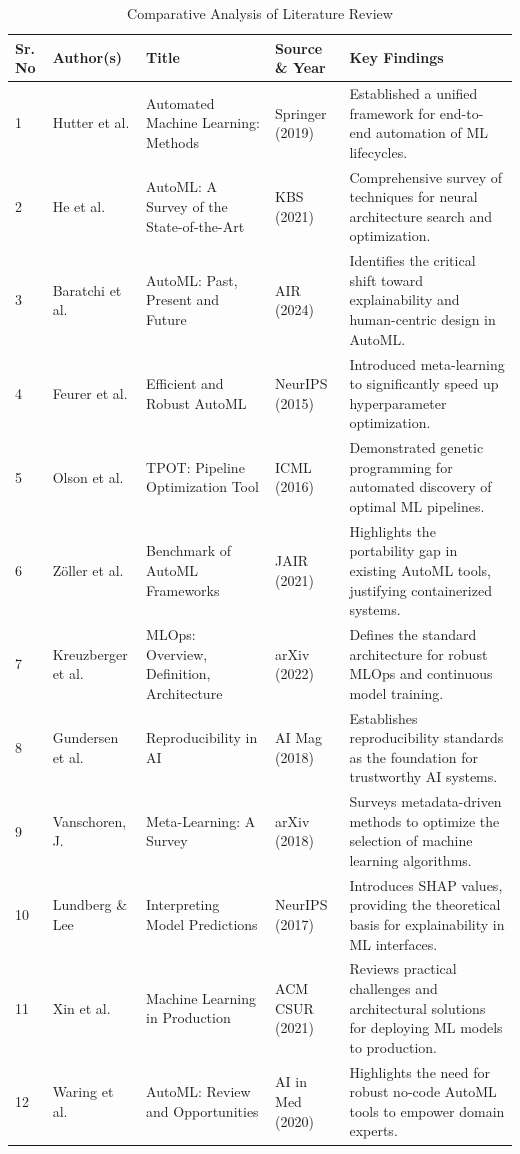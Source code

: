 \begin{table}[H]
    \centering
    \caption{Comparative Analysis of Literature Review}
    \label{tab:lit_review}
    \small
    \begin{tabular}{|p{0.8cm}|p{2.2cm}|p{4.0cm}|p{2.2cm}|p{5.2cm}|}
    \hline
    \textbf{Sr. No} & \textbf{Author(s)} & \textbf{Title} & \textbf{Source \& Year} & \textbf{Key Findings} \\ \hline
    1 & Hutter et al. & Automated Machine Learning: Methods & Springer (2019) & Established a unified framework for end-to-end automation of ML lifecycles. \\ \hline
    2 & He et al. & AutoML: A Survey of the State-of-the-Art & KBS (2021) & Comprehensive survey of techniques for neural architecture search and optimization. \\ \hline
    3 & Baratchi et al. & AutoML: Past, Present and Future & AIR (2024) & Identifies the critical shift toward explainability and human-centric design in AutoML. \\ \hline
    4 & Feurer et al. & Efficient and Robust AutoML & NeurIPS (2015) & Introduced meta-learning to significantly speed up hyperparameter optimization. \\ \hline
    5 & Olson et al. & TPOT: Pipeline Optimization Tool & ICML (2016) & Demonstrated genetic programming for automated discovery of optimal ML pipelines. \\ \hline
    6 & Zöller et al. & Benchmark of AutoML Frameworks & JAIR (2021) & Highlights the portability gap in existing AutoML tools, justifying containerized systems. \\ \hline
    7 & Kreuzberger et al. & MLOps: Overview, Definition, Architecture & arXiv (2022) & Defines the standard architecture for robust MLOps and continuous model training. \\ \hline
    8 & Gundersen et al. & Reproducibility in AI & AI Mag (2018) & Establishes reproducibility standards as the foundation for trustworthy AI systems. \\ \hline
    9 & Vanschoren, J. & Meta-Learning: A Survey & arXiv (2018) & Surveys metadata-driven methods to optimize the selection of machine learning algorithms. \\ \hline
    10 & Lundberg \& Lee & Interpreting Model Predictions & NeurIPS (2017) & Introduces SHAP values, providing the theoretical basis for explainability in ML interfaces. \\ \hline
    11 & Xin et al. & Machine Learning in Production & ACM CSUR (2021) & Reviews practical challenges and architectural solutions for deploying ML models to production. \\ \hline
    12 & Waring et al. & AutoML: Review and Opportunities & AI in Med (2020) & Highlights the need for robust no-code AutoML tools to empower domain experts. \\ \hline
    \end{tabular}
\end{table}
